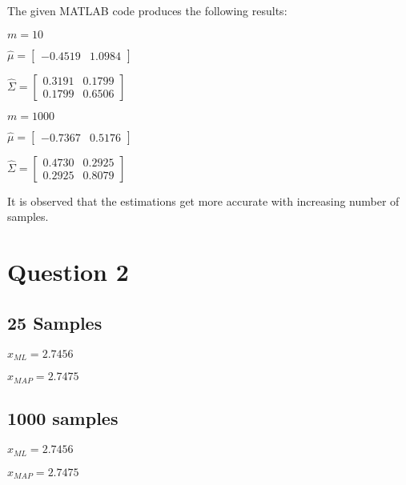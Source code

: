 \documentclass[11pt]{extarticle}
\begin{document}
The given MATLAB code produces the following results: \\
\begin{minipage}{0.2\textwidth}
    $m = 10$
\end{minipage}
\begin{minipage}{0.35\textwidth}
    $\hat{\mu} = \begin{bmatrix} -0.4519 & 1.0984 \end{bmatrix}$
\end{minipage}
\begin{minipage}{0.66\textwidth}
    $\hat{\Sigma} = \begin{bmatrix} 0.3191 & 0.1799 \\ 0.1799 & 0.6506 \end{bmatrix}$
\end{minipage}
\begin{minipage}{0.2\textwidth}
    $m = 1000$
\end{minipage}
\begin{minipage}{0.35\textwidth}
    $\hat{\mu} = \begin{bmatrix} -0.7367 & 0.5176 \end{bmatrix}$
\end{minipage}
\begin{minipage}{0.66\textwidth}
    $\hat{\Sigma} = \begin{bmatrix} 0.4730 & 0.2925 \\ 0.2925 & 0.8079 \end{bmatrix}$
\end{minipage}
It is observed that the estimations get more accurate with increasing number of samples.

\section*{Question 2}

\subsection*{25 Samples}
\begin{minipage}{0.3\textwidth}
    ${\hat{x}}_{ML} = 2.7456$
\end{minipage}
\begin{minipage}{0.6\textwidth}
    ${\hat{x}}_{MAP} = 2.7475$
\end{minipage}

\subsection*{1000 samples}
\begin{minipage}{0.3\textwidth}
    ${\hat{x}}_{ML} = 2.7456$
\end{minipage}
\begin{minipage}{0.6\textwidth}
    ${\hat{x}}_{MAP} = 2.7475$
\end{minipage}
\end{document}
